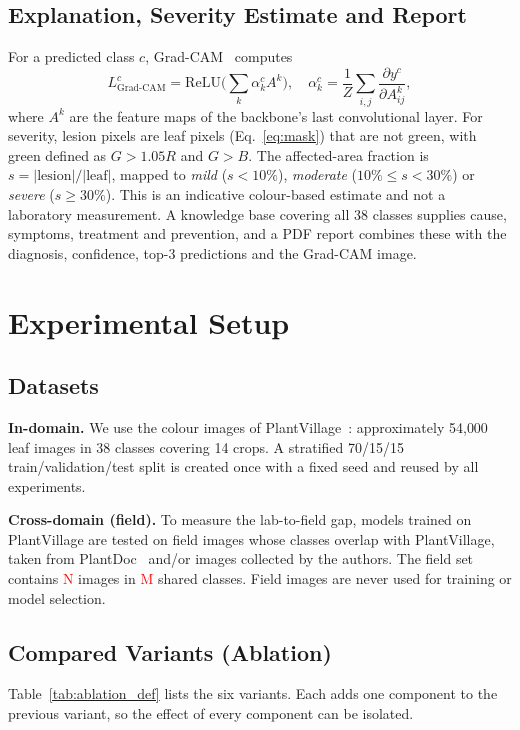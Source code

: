 \documentclass[conference]{IEEEtran}
\newcommand{\tbd}[1]{\textcolor{red}{#1}}
\newcommand{\FieldN}{\tbd{N}}\newcommand{\FieldM}{\tbd{M}}
\begin{document}
\subsection{Explanation, Severity Estimate and Report}
For a predicted class $c$, Grad-CAM~\cite{selvaraju2017} computes
\begin{equation}
L^{c}_{\mathrm{Grad\text{-}CAM}} = \mathrm{ReLU}\Big(\sum_k \alpha^c_k A^k\Big),\quad \alpha^c_k=\frac{1}{Z}\sum_{i,j}\frac{\partial y^c}{\partial A^k_{ij}},
\end{equation}
where $A^k$ are the feature maps of the backbone's last convolutional layer. For severity, lesion pixels are leaf pixels (Eq.~\ref{eq:mask}) that are not green, with green defined as $G>1.05R$ and $G>B$. The affected-area fraction is $s=|\text{lesion}|/|\text{leaf}|$, mapped to \emph{mild} ($s<10\%$), \emph{moderate} ($10\%\le s<30\%$) or \emph{severe} ($s\ge30\%$). This is an indicative colour-based estimate and not a laboratory measurement. A knowledge base covering all 38 classes supplies cause, symptoms, treatment and prevention, and a PDF report combines these with the diagnosis, confidence, top-3 predictions and the Grad-CAM image.

\section{Experimental Setup}
\subsection{Datasets}
\textbf{In-domain.} We use the colour images of PlantVillage~\cite{hughes2015}: approximately 54{,}000 leaf images in 38 classes covering 14 crops. A stratified 70/15/15 train/validation/test split is created once with a fixed seed and reused by all experiments.

\textbf{Cross-domain (field).} To measure the lab-to-field gap, models trained on PlantVillage are tested on field images whose classes overlap with PlantVillage, taken from PlantDoc~\cite{singh2020} and/or images collected by the authors. The field set contains \FieldN{} images in \FieldM{} shared classes. Field images are never used for training or model selection.

\subsection{Compared Variants (Ablation)}
Table~\ref{tab:ablation_def} lists the six variants. Each adds one component to the previous variant, so the effect of every component can be isolated.
\end{document}
